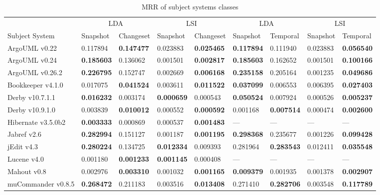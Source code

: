 \begin{table*}[ht]
\renewcommand{\arraystretch}{1.3}
\footnotesize
\centering
\caption{MRR of subject systems classes}
\begin{tabular}{l|ll|ll||ll|ll}
    \toprule
                        & \multicolumn{2}{c|}{LDA}      &  \multicolumn{2}{c||}{LSI}    & \multicolumn{2}{c|}{LDA}      &  \multicolumn{2}{c}{LSI}  \\
    Subject System      & Snapshot      & Changeset     & Snapshot      & Changeset     & Snapshot      & Temporal      & Snapshot      & Temporal  \\
    \midrule
ArgoUML v0.22 & 0.117894 & {\bf 0.147477 } & 0.023883 & {\bf 0.025465 } & {\bf 0.117894 } & 0.111940 & 0.023883 & {\bf 0.056540 } \\
ArgoUML v0.24 & {\bf 0.185603 } & 0.136062 & 0.001501 & {\bf 0.002817 } & {\bf 0.185603 } & 0.162652 & 0.001501 & {\bf 0.100166 } \\
ArgoUML v0.26.2 & {\bf 0.226795 } & 0.152747 & 0.002669 & {\bf 0.006168 } & {\bf 0.235158 } & 0.205164 & 0.001235 & {\bf 0.049686 } \\
Bookkeeper v4.1.0 & 0.017075 & {\bf 0.041524 } & 0.003611 & {\bf 0.011522 } & {\bf 0.037099 } & 0.006553 & 0.006395 & {\bf 0.027403 } \\
Derby v10.7.1.1 & {\bf 0.016232 } & 0.003174 & {\bf 0.000659 } & 0.000543 & {\bf 0.050524 } & 0.007924 & 0.000526 & {\bf 0.005237 } \\
Derby v10.9.1.0 & 0.003839 & {\bf 0.010012 } & 0.000552 & {\bf 0.000592 } & 0.001168 & {\bf 0.007514 } & 0.000474 & {\bf 0.002600 } \\
Hibernate v3.5.0b2 & {\bf 0.003333 } & 0.000869 & 0.000537 & {\bf 0.001483 } & --- & --- & --- & --- \\
Jabref v2.6 & {\bf 0.282994 } & 0.151127 & 0.001187 & {\bf 0.001195 } & {\bf 0.298368 } & 0.235677 & 0.001226 & {\bf 0.099428 } \\
jEdit v4.3 & {\bf 0.280224 } & 0.134725 & {\bf 0.012334 } & 0.009393 & 0.281964 & {\bf 0.283543 } & 0.012411 & {\bf 0.035548 } \\
Lucene v4.0 & 0.001180 & {\bf 0.001233 } & {\bf 0.001145 } & 0.000408 & --- & --- & --- & --- \\
Mahout v0.8 & 0.002976 & {\bf 0.003310 } & 0.001032 & {\bf 0.001165 } & {\bf 0.009379 } & 0.001935 & 0.001378 & {\bf 0.002907 } \\
muCommander v0.8.5 & {\bf 0.268472 } & 0.211183 & 0.003516 & {\bf 0.013408 } & 0.271410 & {\bf 0.282706 } & 0.003548 & {\bf 0.117789 } \\

\end{tabular}
\end{table*}
